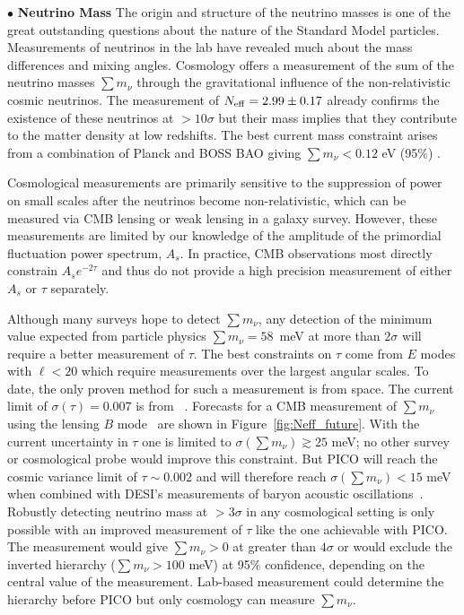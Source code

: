 \documentclass[PICOReport.tex]{subfiles}
\begin{document}
 $\bullet$ {\bf Neutrino Mass} \hspace{0.1in} The origin and structure of the neutrino masses is one of the great outstanding  questions about the nature of the Standard Model particles.  Measurements of neutrinos in the lab have revealed much  about the mass differences and mixing angles.  Cosmology offers a  measurement of the sum of the neutrino masses $\sum m_\nu$ through the gravitational influence of the non-relativistic  cosmic neutrinos.  The measurement of ${N_{\rm eff}} = 2.99 \pm 0.17$  already confirms the existence of these neutrinos at $>10\sigma$ but their  mass implies that they contribute to the matter density at low redshifts.  The best current mass constraint arises from a combination of  Planck and BOSS \ac{BAO} giving $\sum m_\nu < 0.12$ eV (95\%) .

Cosmological measurements are primarily sensitive to the suppression of power on small scales after the neutrinos become non-relativistic, which can be measured via CMB lensing or weak lensing in a galaxy survey.  However, these measurements are limited by our knowledge of the amplitude of the primordial fluctuation power spectrum, $A_s$.  In practice, CMB observations most directly constrain $A_s e^{-2 \tau}$ and thus do not provide a high precision measurement of either $A_s$ or $\tau$ separately.  


Although many surveys hope to detect $\sum m_\nu$, any detection of the minimum value expected from particle physics $\sum m_\nu = 58$~meV at more than $2 \sigma$ will require a better measurement of $\tau$.  The best constraints on $\tau$ come from $E$ modes with $\ell < 20$ which require measurements over the largest angular scales. To date, the only proven method for such a measurement is from space. The current limit of $\sigma({\tau}) = 0.007$ is from \planck~\cite{planck2016_xlvi}.  Forecasts for a CMB measurement of $\sum m_\nu$ using the lensing $B$ mode~\cite{Kaplinghat:2003bh} are shown in Figure~\ref{fig:Neff_future}.  With the current uncertainty in $\tau$ one is limited to  $\sigma(\sum m_\nu) \gtrsim 25$ meV; no other survey or cosmological probe would improve this constraint.   But PICO will reach the cosmic variance limit of $\tau \sim 0.002$ and will therefore reach $\sigma(\sum m_\nu) < 15$ meV when combined with DESI's measurements of baryon acoustic oscillations~\cite{Levi:2013gra}.  Robustly detecting neutrino mass at  $> 3\sigma$ in any cosmological setting is only possible with an improved measurement of $\tau$ like the one achievable with PICO. The measurement would give  $\sum m_\nu>0$ at greater than $4\sigma$ or would exclude the inverted hierarchy ($\sum m_\nu > 100$ meV) at 95\% confidence, depending on the central value of the measurement.  Lab-based measurement could determine the hierarchy before PICO but only cosmology can measure $\sum m_\nu$.
\end{document}

